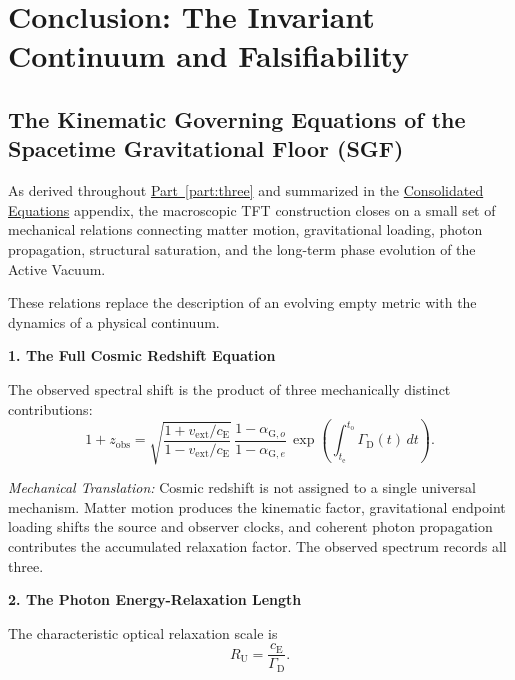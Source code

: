\chapter{Conclusion: The Invariant Continuum and Falsifiability}
\label{chap:part3_conclusion}


\section{The Kinematic Governing Equations of the Spacetime Gravitational Floor (SGF)}

As derived throughout \hyperref[part:three]{Part~\ref{part:three}} and summarized in the \hyperref[app:consolidated_equations]{Consolidated Equations} appendix, the macroscopic TFT construction closes on a small set of mechanical relations connecting matter motion, gravitational loading, photon propagation, structural saturation, and the long-term phase evolution of the Active Vacuum.

These relations replace the description of an evolving empty metric with the dynamics of a physical continuum.

\vspace{0.5em}

\noindent\textbf{1. The Full Cosmic Redshift Equation}

The observed spectral shift is the product of three mechanically distinct contributions:
\begin{equation}
    1+z_{\mathrm{obs}} = \sqrt{ \frac{1+v_{\mathrm{ext}}/c_{\mathrm E}}{1-v_{\mathrm{ext}}/c_{\mathrm E}} } \, \frac{1-\alpha_{\mathrm G,o}}{1-\alpha_{\mathrm G,e}} \, \exp\left( \int_{t_{\mathrm e}}^{t_{\mathrm o}} \Gamma_{\mathrm D}(t)\,dt \right).
\end{equation}

\textit{Mechanical Translation:} Cosmic redshift is not assigned to a single universal mechanism. Matter motion produces the kinematic factor, gravitational endpoint loading shifts the source and observer clocks, and coherent photon propagation contributes the accumulated relaxation factor. The observed spectrum records all three.

\vspace{0.5em}

\noindent\textbf{2. The Photon Energy-Relaxation Length}

The characteristic optical relaxation scale is
\begin{equation}
    R_{\mathrm U} = \frac{c_{\mathrm E}}{\Gamma_{\mathrm D}}.
\end{equation}

